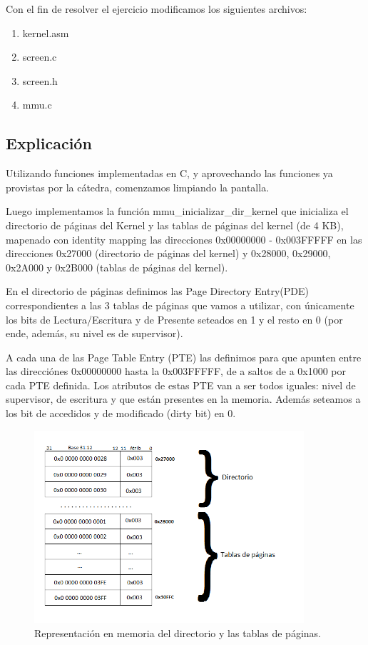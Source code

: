 \documentclass[a4paper]{article}
\begin{document}
Con el fin de resolver el ejercicio modificamos los siguientes archivos:

\begin{enumerate}
\item kernel.asm
\item screen.c
\item screen.h
\item mmu.c

\end{enumerate}


\subsection{Explicación}

Utilizando funciones implementadas en C, y aprovechando las funciones ya provistas por la cátedra, comenzamos limpiando la pantalla.

Luego implementamos la función mmu_inicializar_dir_kernel que inicializa el directorio de páginas del Kernel y las tablas de páginas del kernel (de 4 KB), mapenado con identity mapping las direcciones 0x00000000 - 0x003FFFFF en las direcciones 0x27000 (directorio de páginas del kernel) y 0x28000, 0x29000, 0x2A000 y 0x2B000 (tablas de páginas del kernel).

En el directorio de páginas definimos las Page Directory Entry(PDE) correspondientes a las 3 tablas de páginas que vamos a utilizar, con únicamente los bits de Lectura/Escritura y de Presente seteados en 1 y el resto en 0 (por ende, además, su nivel es de supervisor).

A cada una de las Page Table Entry (PTE) las definimos para que apunten entre las direcciónes 0x00000000 hasta la 0x003FFFFF, de a saltos de a 0x1000 por cada PTE definida. Los atributos de estas PTE van a ser todos iguales: nivel de supervisor, de escritura y que están presentes en la memoria. Además seteamos a los bit de accedidos y de modificado (dirty bit) en 0.

\begin{figure}[ht!]
\centering
\includegraphics[width=100mm]{imagenes/DirectorioYTablas.png}
\caption {Representación en memoria del directorio y las tablas de páginas.}
\end{figure}
\end{document}
